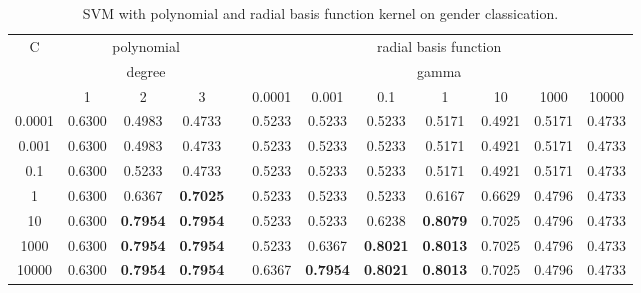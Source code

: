 \documentclass[a4paper]{llncs}
\begin{document}
\begin{table}[!htbp]
\centering
\begin{tabular}{|c|ccc|c|ccccccc|}
\cline{1-4} \cline{6-12}
\multirow{3}{*}{C} & \multicolumn{3}{c|}{polynomial}            &  & \multicolumn{7}{c|}{radial basis function}                                              \\ \cline{2-4} \cline{6-12} 
                   & \multicolumn{3}{c|}{degree}                &  & \multicolumn{7}{c|}{gamma}                                                              \\ %
                   & 1      & 2               & 3               &  & 0.0001 & 0.001           & 0.1             & 1               & 10     & 1000   & 10000  \\ \cline{1-4} \cline{6-12} 
0.0001             & 0.6300 & 0.4983          & 0.4733          &  & 0.5233 & 0.5233          & 0.5233          & 0.5171          & 0.4921 & 0.5171 & 0.4733 \\ %
0.001              & 0.6300 & 0.4983          & 0.4733          &  & 0.5233 & 0.5233          & 0.5233          & 0.5171          & 0.4921 & 0.5171 & 0.4733 \\ %
0.1                & 0.6300 & 0.5233          & 0.4733          &  & 0.5233 & 0.5233          & 0.5233          & 0.5171          & 0.4921 & 0.5171 & 0.4733 \\ %
1                  & 0.6300 & 0.6367          & \textbf{0.7025} &  & 0.5233 & 0.5233          & 0.5233          & 0.6167          & 0.6629 & 0.4796 & 0.4733 \\ %
10                 & 0.6300 & \textbf{0.7954} & \textbf{0.7954} &  & 0.5233 & 0.5233          & 0.6238          & \textbf{0.8079} & 0.7025 & 0.4796 & 0.4733 \\ %
1000               & 0.6300 & \textbf{0.7954} & \textbf{0.7954} &  & 0.5233 & 0.6367          & \textbf{0.8021} & \textbf{0.8013} & 0.7025 & 0.4796 & 0.4733 \\ %
10000              & 0.6300 & \textbf{0.7954} & \textbf{0.7954} &  & 0.6367 & \textbf{0.7954} & \textbf{0.8021} & \textbf{0.8013} & 0.7025 & 0.4796 & 0.4733 \\ \cline{1-4} \cline{6-12} 
\end{tabular}
\caption{SVM with polynomial and radial basis function kernel on gender classication.}
\label{table:SVMPolyAndRBFGender}
\end{table}
\end{document}

